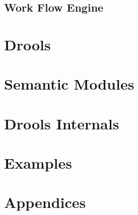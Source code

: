 \documentclass[10pt,oneside,letterpaper,colorhighlight]{book}
\begin{document}
\chapter {Work Flow Engine}
\part{Drools}

%











\part{Semantic Modules}









\part{Drools Internals}










\part{Examples}






\part{Appendices}
\appendix










\backmatter
{\footnotesize
\pagestyle{plain}
\printindex
}

%
\end{document}
